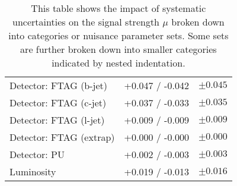\begin{table}[ht]
\begin{tabular}{lrr}
    \:\:\:\: Detector: FTAG (b-jet)   & +0.047 / -0.042 & $ \pm 0.045 $ \\
    \:\:\:\: Detector: FTAG (c-jet)   & +0.037 / -0.033 & $ \pm 0.035 $ \\
    \:\:\:\: Detector: FTAG (l-jet)   & +0.009 / -0.009 & $ \pm 0.009 $ \\
    \:\:\:\: Detector: FTAG (extrap)  & +0.000 / -0.000 & $ \pm 0.000 $ \\
    \:\:\:\: Detector: PU             & +0.002 / -0.003 & $ \pm 0.003 $ \\
    \:\:\:\: Luminosity               & +0.019 / -0.013 & $ \pm 0.016 $ \\
    \bottomrule
  \end{tabular}
\caption{This table shows the impact of systematic uncertainties on the signal
  strength $\mu$ broken down into categories or nuisance parameter sets. Some
  sets are further broken down into smaller categories indicated by nested
  indentation.}
\label{tab:breakdown_012L_MVAVH}
\end{table}